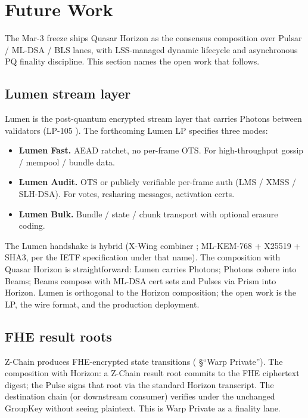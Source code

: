 \section{Future Work}
\label{sec:future-work}

The Mar-3 freeze ships Quasar Horizon as the consensus composition over Pulsar / ML-DSA / BLS lanes, with LSS-managed dynamic lifecycle and asynchronous PQ finality discipline. This section names the open work that follows.

\subsection{Lumen stream layer}

Lumen is the post-quantum encrypted stream layer that carries Photons between validators (LP-105 \cite{lp105}). The forthcoming Lumen LP specifies three modes:
\begin{itemize}[leftmargin=2em,nosep]
  \item \textbf{Lumen Fast.} AEAD ratchet, no per-frame OTS. For high-throughput gossip / mempool / bundle data.
  \item \textbf{Lumen Audit.} OTS or publicly verifiable per-frame auth (LMS / XMSS / SLH-DSA). For votes, resharing messages, activation certs.
  \item \textbf{Lumen Bulk.} Bundle / state / chunk transport with optional erasure coding.
\end{itemize}

The Lumen handshake is hybrid (X-Wing combiner \cite{lp105}; ML-KEM-768 + X25519 + SHA3, per the IETF specification under that name). The composition with Quasar Horizon is straightforward: Lumen carries Photons; Photons cohere into Beams; Beams compose with ML-DSA cert sets and Pulses via Prism into Horizon. Lumen is orthogonal to the Horizon composition; the open work is the LP, the wire format, and the production deployment.

\subsection{FHE result roots}

Z-Chain produces FHE-encrypted state transitions (\cite{luxwarpv2} \S``Warp Private''). The composition with Horizon: a Z-Chain result root commits to the FHE ciphertext digest; the Pulse signs that root via the standard Horizon transcript. The destination chain (or downstream consumer) verifies under the unchanged GroupKey without seeing plaintext. This is Warp Private as a finality lane.

